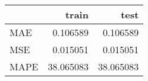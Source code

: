 \begin{tabular}{lrr}
\toprule
{} &      train &       test \\
\midrule
MAE  &   0.106589 &   0.106589 \\
MSE  &   0.015051 &   0.015051 \\
MAPE &  38.065083 &  38.065083 \\
\bottomrule
\end{tabular}

